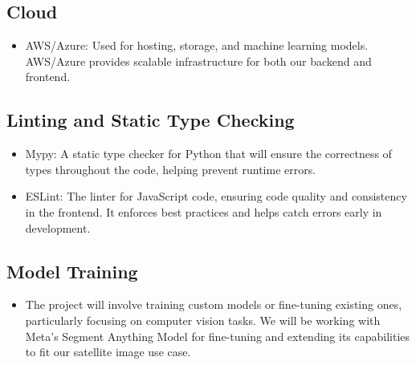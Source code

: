 \documentclass{article}
\begin{document}
  \subsection{Cloud}
  \begin{itemize}
      \item AWS/Azure: Used for hosting, storage, and machine learning models. AWS/Azure provides scalable infrastructure for both our backend and frontend.
 \end{itemize}
  \subsection{Linting and Static Type Checking}
  \begin{itemize}
    \item Mypy: A static type checker for Python that will ensure the correctness of types throughout the code, helping prevent runtime errors.
    \item ESLint: The linter for JavaScript code, ensuring code quality and consistency in the frontend. It enforces best practices and helps catch errors early in development.
  \end{itemize}

   \subsection{Model Training}
  \begin{itemize}
      \item The project will involve training custom models or fine-tuning existing ones, particularly focusing on computer vision tasks. We will be working with Meta’s Segment Anything Model for fine-tuning and extending its capabilities to fit our satellite image use case.

  \end{itemize}
  


\end{document}
